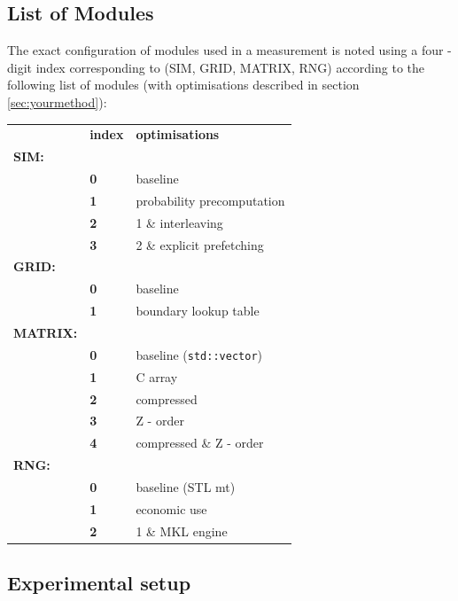 \documentclass[letterpaper]{article}
\begin{document}
\subsection{List of Modules}
The exact configuration of modules used in a measurement is noted using a four - digit index corresponding to (SIM, GRID, MATRIX, RNG) according to the following list of modules (with optimisations described in section \ref{sec:yourmethod}):
\begin{table}[h]
\begin{tabular}{ll|l}
& \textbf{index} & \textbf{optimisations} \\\cline{2-3}
\textbf{SIM:} \\\hline
& \textbf{0} & baseline \\\cline{2-3}
& \textbf{1} & probability precomputation\\\cline{2-3}
& \textbf{2} & 1 \& interleaving \\\cline{2-3}
& \textbf{3} & 2 \& explicit prefetching\\\cline{2-3}
\textbf{GRID:}\\\hline
& \textbf{0} & baseline \\\cline{2-3}
& \textbf{1} & boundary lookup table \\\cline{2-3}
\textbf{MATRIX:}\\\hline
& \textbf{0} & baseline (\texttt{std::vector}) \\\cline{2-3}
& \textbf{1} & C array \\\cline{2-3}
& \textbf{2} & compressed \\\cline{2-3}
& \textbf{3} & Z - order \\\cline{2-3}
& \textbf{4} & compressed \& Z - order\\\cline{2-3}
\textbf{RNG:} \\\hline
& \textbf{0} & baseline (STL mt)\\\cline{2-3}
& \textbf{1} & economic use \\\cline{2-3}
& \textbf{2} & 1 \& MKL engine\\\cline{2-3}
\end{tabular}
\end{table}

\subsection{Experimental setup} 
\end{document}
